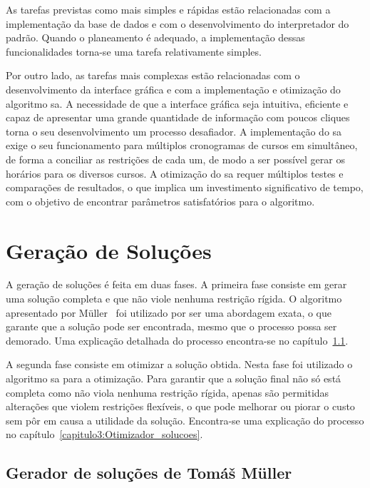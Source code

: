 As tarefas previstas como mais simples e rápidas estão relacionadas com a implementação da base de dados e com o desenvolvimento do interpretador do padrão. Quando o planeamento é adequado, a implementação dessas funcionalidades torna-se uma tarefa relativamente simples.

Por outro lado, as tarefas mais complexas estão relacionadas com o desenvolvimento da interface gráfica e com a implementação e otimização do algoritmo \gls{sa}. A necessidade de que a interface gráfica seja intuitiva, eficiente e capaz de apresentar uma grande quantidade de informação com poucos cliques torna o seu desenvolvimento um processo desafiador. A implementação do \gls{sa} exige o seu funcionamento para múltiplos cronogramas de cursos em simultâneo, de forma a conciliar as restrições de cada um, de modo a ser possível gerar os horários para os diversos cursos. A otimização do \gls{sa} requer múltiplos testes e comparações de resultados, o que implica um investimento significativo de tempo, com o objetivo de encontrar parâmetros satisfatórios para o algoritmo.

\section{Geração de Soluções}

A geração de soluções é feita em duas fases. A primeira fase consiste em gerar uma solução completa e que não viole nenhuma restrição rígida. O algoritmo apresentado por Müller~\cite{ConstraintbasedTimetabling-Mueller} foi utilizado por ser uma abordagem exata, o que garante que a solução pode ser encontrada, mesmo que o processo possa ser demorado. Uma explicação detalhada do processo encontra-se no capítulo~\ref{capitulo3:Gerador_solucoes_iniciais}.

A segunda fase consiste em otimizar a solução obtida. Nesta fase foi utilizado o algoritmo \gls{sa} para a otimização. Para garantir que a solução final não só está completa como não viola nenhuma restrição rígida, apenas são permitidas alterações que violem restrições flexíveis, o que pode melhorar ou piorar o custo sem pôr em causa a utilidade da solução. Encontra-se uma explicação do processo no capítulo~\ref{capitulo3:Otimizador_solucoes}.

\subsection{Gerador de soluções de Tomáš Müller}
\label{capitulo3:Gerador_solucoes_iniciais}

